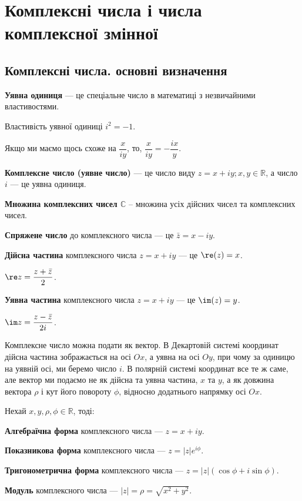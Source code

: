 \chapter{Комплексні числа і числа комплексної змінної}

\section{Комплексні числа. основні визначення}

\textbf{Уявна одиниця} --- це спеціальне число в математиці з незвичайними властивостями.

Властивість уявної одиниці $i^2 = -1$.

Якщо ми маємо щось схоже на $\dfrac{x}{iy}$, то, $\dfrac{x}{iy} = - \dfrac{ix}{y}$.

\textbf{Комплексне число (уявне число)} --- це число виду $z = x + iy; x, y \in \mathbb{R}$,
а число $i$ --- це уявна одиниця.

\textbf{Множина комплексних чисел $\mathbb{C}$} -- множина усіх дійсних чисел та комплексних чисел.

\textbf{Спряжене число} до комплексного числа --- це $\bar z = x - iy$.

\textbf{Дійсна частина} комплексного числа $z = x + iy$ --- це $\re(z) = x$.

$\re z = \dfrac{z + \bar{z}}{2}$.

\textbf{Уявна частина} комплексного числа $z = x + iy$ --- це $\im(z) = y$.

$\im z = \dfrac{z - \bar{z}}{2i}$.

Комплексне число можна подати як вектор.
В Декартовій системі координат дійсна частина зображається на осі $Ox$, а уявна на осі $Oy$, при чому за одиницю на уявній осі, ми беремо число $i$.
В полярній системі координат все те ж саме, але вектор ми подаємо не як дійсна  та уявна частина, $x$ та $y$, а як довжина вектора $\rho$ і кут його повороту $\phi$, відносно додатнього напрямку осі $Ox$.

Нехай $x, y, \rho, \phi \in \mathbb{R}$, тоді:

\textbf{Алгебраїчна форма} комплексного числа --- $z = x + iy$.

\textbf{Показникова форма} комплексного числа --- $z = |z|e^{i \phi}$.

\textbf{Тригонометрична форма} комплексного числа --- $z = |z| (\cos \phi + i \sin \phi)$.

\textbf{Модуль} комплексного числа --- $|z| = \rho = \sqrt{x^2 + y^2}$.

